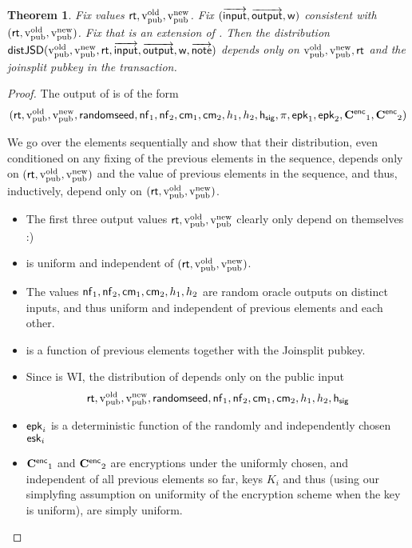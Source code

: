 \documentclass[11pt]{article}
\numberwithin{equation}{section} %
\numberwithin{figure}{section} %
\newtheorem{thm}{Theorem}[section]
\begin{document}
\begin{thm}\label{thm:privacy}
Fix values $\mathsf{rt},\mathrm{v_{pub}^{old}},\mathrm{v_{pub}^{new}}$.
Fix $(\overrightarrow{\mathsf{input}},\overrightarrow{\mathsf{output}},\mathsf{w})$ consistent with $(\mathsf{rt},\mathrm{v_{pub}^{old}},\mathrm{v_{pub}^{new}})$.
Fix \notes that is an extension of \outputs.
Then the distribution $\mathsf{distJSD}(\mathrm{v_{pub}^{old}},\mathrm{v_{pub}^{new}},\mathsf{rt},\overrightarrow{\mathsf{input}},\overrightarrow{\mathsf{output}},\mathsf{w},\overrightarrow{\mathsf{note}})$
 depends only on $\mathrm{v_{pub}^{old}},\mathrm{v_{pub}^{new}},\mathsf{rt}$ and the joinsplit pubkey in the transaction.
\end{thm}
\begin{proof}
The output of \makejsd is of the form
\[(\mathsf{rt},\mathrm{v_{pub}^{old}},\mathrm{v_{pub}^{new}},\mathsf{randomseed},\mathsf{nf}_1,\mathsf{nf}_2,\mathsf{cm}_1,\mathsf{cm}_2,h_1,h_2,\mathsf{h_{sig}},\pi,\mathsf{epk}_1,\mathsf{epk}_2,\mathbf{C^{\mathsf{enc}}}_1,\mathbf{C^{\mathsf{enc}}}_2)\]

We go over the elements sequentially and show that their distribution, even conditioned on any fixing of the previous elements in the sequence,
depends only on $(\mathsf{rt},\mathrm{v_{pub}^{old}},\mathrm{v_{pub}^{new}})$ and the value of previous elements in the sequence, and thus, inductively, depend only on $(\mathsf{rt},\mathrm{v_{pub}^{old}},\mathrm{v_{pub}^{new}})$.
\begin{itemize}
 \item  The first three output values $\mathsf{rt},\mathrm{v_{pub}^{old}},\mathrm{v_{pub}^{new}}$ clearly only depend on themselves :)
\item  \randomseed is uniform and independent of $(\mathsf{rt},\mathrm{v_{pub}^{old}},\mathrm{v_{pub}^{new}})$.
\item  The values $\mathsf{nf}_1,\mathsf{nf}_2,\mathsf{cm}_1,\mathsf{cm}_2,h_1,h_2$ are random oracle outputs on distinct inputs, and thus uniform and independent of previous elements
and each other.
\item \hsig is a function of previous elements together with the Joinsplit pubkey.
\item Since \snark is WI, the distribution of \prf depends only on the public input 
\[\mathsf{rt},\mathrm{v_{pub}^{old}},\mathrm{v_{pub}^{new}},\mathsf{randomseed},\mathsf{nf}_1,\mathsf{nf}_2,\mathsf{cm}_1,\mathsf{cm}_2,h_1,h_2,\mathsf{h_{sig}}\]
\item $\mathsf{epk}_i$ is a deterministic function of the randomly and independently chosen $\mathsf{esk}_i$
 \item $\mathbf{C^{\mathsf{enc}}}_1$ and $\mathbf{C^{\mathsf{enc}}}_2$ are encryptions under the uniformly chosen, and independent of all previous elements so far, keys $K_i$ and thus (using our simplyfing assumption on uniformity of the encryption scheme when the key is uniform), are simply uniform.
\end{itemize}

\end{proof}












\end{document}
